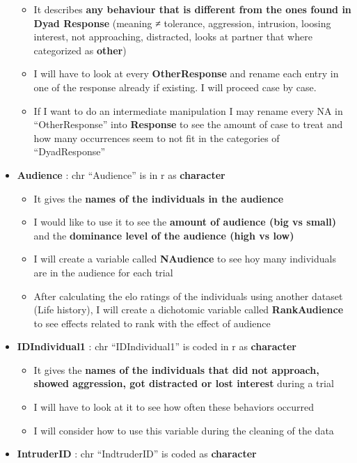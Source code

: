 \documentclass[
]{article}
\providecommand{\tightlist}{%
  \setlength{\itemsep}{0pt}\setlength{\parskip}{0pt}}
\begin{document}
\begin{itemize}
  \begin{itemize}
  \tightlist
  \item
    It describes \textbf{any behaviour that is different from the ones
    found in Dyad Response} (meaning ≠ tolerance, aggression, intrusion,
    loosing interest, not approaching, distracted, looks at partner that
    where categorized as \textbf{other})
  \item
    I will have to look at every \textbf{OtherResponse} and rename each
    entry in one of the response already if existing. I will proceed
    case by case.
  \item
    If I want to do an intermediate manipulation I may rename every NA
    in ``OtherResponse'' into \textbf{Response} to see the amount of
    case to treat and how many occurrences seem to not fit in the
    categories of ``DyadResponse''
  \end{itemize}
\item
  \textbf{Audience} : chr ``Audience'' is in r as \textbf{character}

  \begin{itemize}
  \tightlist
  \item
    It gives the \textbf{names of the individuals in the audience}
  \item
    I would like to use it to see the \textbf{amount of audience (big vs
    small)} and the \textbf{dominance level of the audience (high vs
    low)}
  \item
    I will create a variable called \textbf{NAudience} to see hoy many
    individuals are in the audience for each trial
  \item
    After calculating the elo ratings of the individuals using another
    dataset (Life history), I will create a dichotomic variable called
    \textbf{RankAudience} to see effects related to rank with the effect
    of audience
  \end{itemize}
\item
  \textbf{IDIndividual1} : chr ``IDIndividual1'' is coded in r as
  \textbf{character}

  \begin{itemize}
  \tightlist
  \item
    It gives the \textbf{names of the individuals that did not approach,
    showed aggression, got distracted or lost interest} during a trial
  \item
    I will have to look at it to see how often these behaviors occurred
  \item
    I will consider how to use this variable during the cleaning of the
    data
  \end{itemize}
\item
  \textbf{IntruderID} : chr ``IndtruderID'' is coded as
  \textbf{character}


\end{itemize}
\end{document}

